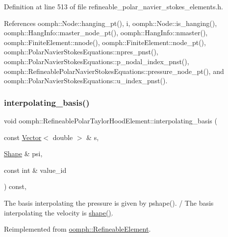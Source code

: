 Definition at line 513 of file refineable\+\_\+polar\+\_\+navier\+\_\+stokes\+\_\+elements.\+h.



References oomph\+::\+Node\+::hanging\+\_\+pt(), i, oomph\+::\+Node\+::is\+\_\+hanging(), oomph\+::\+Hang\+Info\+::master\+\_\+node\+\_\+pt(), oomph\+::\+Hang\+Info\+::nmaster(), oomph\+::\+Finite\+Element\+::nnode(), oomph\+::\+Finite\+Element\+::node\+\_\+pt(), oomph\+::\+Polar\+Navier\+Stokes\+Equations\+::npres\+\_\+pnst(), oomph\+::\+Polar\+Navier\+Stokes\+Equations\+::p\+\_\+nodal\+\_\+index\+\_\+pnst(), oomph\+::\+Refineable\+Polar\+Navier\+Stokes\+Equations\+::pressure\+\_\+node\+\_\+pt(), and oomph\+::\+Polar\+Navier\+Stokes\+Equations\+::u\+\_\+index\+\_\+pnst().

\mbox{\label{classoomph_1_1RefineablePolarTaylorHoodElement_a6add07917cd3a45ca02e3682ef6299c2}} 
\subsubsection{\texorpdfstring{interpolating\+\_\+basis()}{interpolating\_basis()}}
{\footnotesize\ttfamily void oomph\+::\+Refineable\+Polar\+Taylor\+Hood\+Element\+::interpolating\+\_\+basis (\begin{DoxyParamCaption}\item[{const \hyperlink{classoomph_1_1Vector}{Vector}$<$ double $>$ \&}]{s,  }\item[{\hyperlink{classoomph_1_1Shape}{Shape} \&}]{psi,  }\item[{const int \&}]{value\+\_\+id }\end{DoxyParamCaption}) const\hspace{0.3cm}{\ttfamily [inline]}, {\ttfamily [virtual]}}



The basis interpolating the pressure is given by pshape(). / The basis interpolating the velocity is \hyperlink{classoomph_1_1FiniteElement_a58a25b6859ddd43b7bfe64a19fee5023}{shape()}. 



Reimplemented from \hyperlink{classoomph_1_1RefineableElement_a8ca420443c28708e5c6315a80f520137}{oomph\+::\+Refineable\+Element}.



